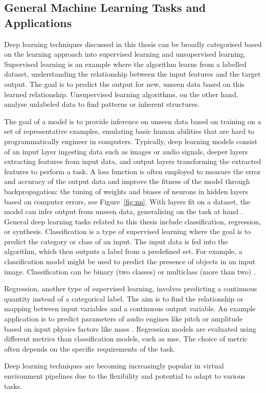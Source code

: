 \subsection{General Machine Learning Tasks and Applications}
Deep learning techniques discussed in this thesis can be broadly categorised based on the learning approach into supervised learning and unsupervised learning. Supervised learning is an example where the algorithm learns from a labelled dataset, understanding the relationship between the input features and the target output. The goal is to predict the output for new, unseen data based on this learned relationship. Unsupervised learning algorithms, on the other hand, analyse unlabeled data to find patterns or inherent structures.\par
The goal of a model is to provide inference on unseen data based on training on a set of representative examples, emulating basic human abilities that are hard to programmatically engineer in computers. Typically, deep learning models consist of an input layer ingesting data such as images or audio signals, deeper layers extracting features from input data, and output layers transforming the extracted features to perform a task. A loss function is often employed to measure the error and accuracy of the output data and improve the fitness of the model through backpropagation: the tuning of weights and biases of neurons in hidden layers based on computer errors, see Figure~\ref{fig:nn}. With layers fit on a dataset, the model can infer output from unseen data, generalising on the task at hand \citep{szeliski2022computer}.
General deep learning tasks related to this thesis include classification, regression, or synthesis.
Classification is a type of supervised learning where the goal is to predict the category or class of an input. The input data is fed into the algorithm, which then outputs a label from a predefined set. For example, a classification model might be used to predict the presence of objects in an input image. Classification can be binary (two classes) or multiclass (more than two) \citep{goodfellow2016deep}.\par
Regression, another type of supervised learning, involves predicting a continuous quantity instead of a categorical label. The aim is to find the relationship or mapping between input variables and a continuous output variable. An example application is to predict parameters of audio engines like pitch or amplitude based on input physics factors like mass \citep{colombo2021psychometric}. Regression models are evaluated using different metrics than classification models, such as \acrfull{mse}. The choice of metric often depends on the specific requirements of the task.\par
Deep learning techniques are becoming increasingly popular in virtual environment pipelines due to the flexibility and potential to adapt to various tasks.

